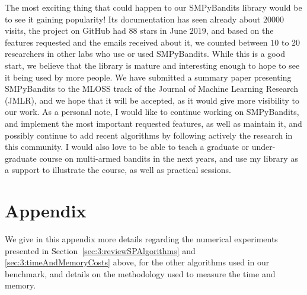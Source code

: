 

The most exciting thing that could happen to our SMPyBandits library would be to see it gaining popularity!
Its documentation has seen already about $20000$ visits, the project on GitHub had $88$ stars in June $2019$, and based on the features requested and the emails received about it, we counted between $10$ to $20$ researchers in other labs who use or used SMPyBandits.
While this is a good start, we believe that the library is mature and interesting enough to hope to see it being used by more people.
%
We have submitted a summary paper presenting SMPyBandits \cite{SMPyBanditsJMLR} to the MLOSS track of the Journal of Machine Learning Research (JMLR), and we hope that it will be accepted, as it would give more visibility to our work.
%
As a personal note, I would like to continue working on SMPyBandits, and implement the most important requested features, as well as maintain it, and possibly continue to add recent algorithms by following actively the research in this community.
I would also love to be able to teach a graduate or under-graduate course on multi-armed bandits in the next years, and use my library as a support to illustrate the course, as well as practical sessions.


\newpage  %
\section{Appendix}
\label{sec:3:appendix}

We give in this appendix more details regarding the numerical experiments presented in Section~\ref{sec:3:reviewSPAlgorithms} and \ref{sec:3:timeAndMemoryCosts} above,
for the other algorithms used in our benchmark,
and details on the methodology used to measure the time and memory.


